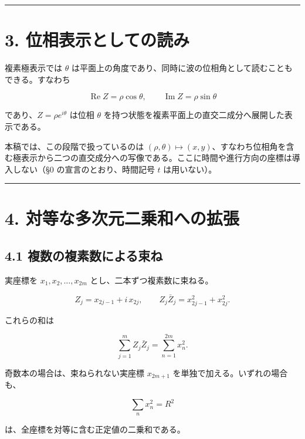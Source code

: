 \documentclass[11pt,a4paper]{ltjsarticle}
\begin{document}
\begin{center}\rule{0.5\linewidth}{0.5pt}\end{center}

\section{3.
位相表示としての読み}\label{ux4f4dux76f8ux8868ux793aux3068ux3057ux3066ux306eux8aadux307f}

複素極表示では \(\theta\)
は平面上の角度であり、同時に波の位相角として読むこともできる。すなわち

\[
\operatorname{Re}Z=\rho\cos\theta,\qquad \operatorname{Im}Z=\rho\sin\theta
\]

であり、\(Z=\rho e^{i\theta}\) は位相 \(\theta\)
を持つ状態を複素平面上の直交二成分へ展開した表示である。

本稿では、この段階で扱っているのは
\((\rho,\theta)\longmapsto(x,y)\)、すなわち位相角を含む極表示から二つの直交成分への写像である。ここに時間や進行方向の座標は導入しない（§0
の宣言のとおり、時間記号 \(t\) は用いない）。

\begin{center}\rule{0.5\linewidth}{0.5pt}\end{center}

\section{4.
対等な多次元二乗和への拡張}\label{ux5bfeux7b49ux306aux591aux6b21ux5143ux4e8cux4e57ux548cux3078ux306eux62e1ux5f35}

\subsection{4.1
複数の複素数による束ね}\label{ux8907ux6570ux306eux8907ux7d20ux6570ux306bux3088ux308bux675fux306d}

実座標を \(x_1,x_2,\dots,x_{2m}\) とし、二本ずつ複素数に束ねる。

\[
Z_j=x_{2j-1}+i\,x_{2j},\qquad Z_j\bar Z_j=x_{2j-1}^2+x_{2j}^2 .
\]

これらの和は

\[
\sum_{j=1}^{m} Z_j\bar Z_j=\sum_{n=1}^{2m} x_n^2 .
\]

奇数本の場合は、束ねられない実座標 \(x_{2m+1}\)
を単独で加える。いずれの場合も、

\[
\sum_n x_n^2=R^2
\]

は、全座標を対等に含む正定値の二乗和である。
\end{document}
